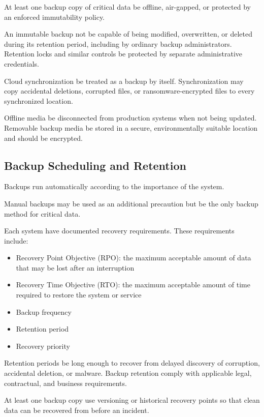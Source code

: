 At least one backup copy of critical data \should{} be offline, air-gapped, or protected by an enforced immutability policy.

An immutable backup \must{} not be capable of being modified, overwritten, or deleted during its retention period, including by ordinary backup administrators. Retention locks and similar controls \should{} be protected by separate administrative credentials.

Cloud synchronization \mustnot{} be treated as a backup by itself. Synchronization may copy accidental deletions, corrupted files, or ransomware-encrypted files to every synchronized location.

Offline media \must{} be disconnected from production systems when not being updated. Removable backup media \should{} be stored in a secure, environmentally suitable location and should be encrypted.

\subsection{Backup Scheduling and Retention}

Backups \should{} run automatically according to the importance of the system.

Manual backups may be used as an additional precaution but \mustnot{} be the only backup method for critical data.

Each system \must{} have documented recovery requirements. These requirements \must{} include:
\begin{itemize}
    \item Recovery Point Objective (RPO): the maximum acceptable amount of data that may be lost after an interruption
    \item Recovery Time Objective (RTO): the maximum acceptable amount of time required to restore the system or service
    \item Backup frequency
    \item Retention period
    \item Recovery priority
\end{itemize}

Retention periods \should{} be long enough to recover from delayed discovery of corruption, accidental deletion, or malware. Backup retention \must{} comply with applicable legal, contractual, and business requirements.

At least one backup copy \should{} use versioning or historical recovery points so that clean data can be recovered from before an incident.

